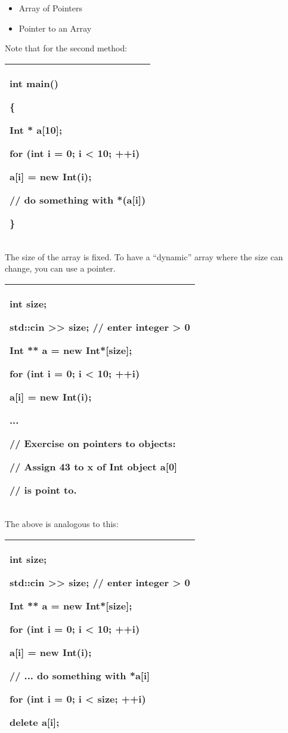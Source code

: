 \documentclass[
]{article}
\providecommand{\tightlist}{%
  \setlength{\itemsep}{0pt}\setlength{\parskip}{0pt}}
\begin{document}
\begin{itemize}
\tightlist
\item
  Array of Pointers
\item
  Pointer to an Array
\end{itemize}

Note that for the second method:

\begin{longtable}[]{@{}l@{}}
\toprule
\endhead
\begin{minipage}[t]{0.97\columnwidth}\raggedright
int main()

\{

Int * a{[}10{]};

for (int i = 0; i \textless{} 10; ++i)

a{[}i{]} = new Int(i);

// do something with *(a{[}i{]})

\}\strut
\end{minipage}\tabularnewline
\bottomrule
\end{longtable}

The size of the array is fixed. To have a ``dynamic'' array where the
size can change, you can use a pointer.

\begin{longtable}[]{@{}l@{}}
\toprule
\endhead
\begin{minipage}[t]{0.97\columnwidth}\raggedright
int size;

std::cin \textgreater\textgreater{} size; // enter integer
\textgreater{} 0

Int ** a = new Int*{[}size{]};

for (int i = 0; i \textless{} 10; ++i)

a{[}i{]} = new Int(i);

...

// Exercise on pointers to objects:

// Assign 43 to x of Int object a{[}0{]}

// is point to. \strut
\end{minipage}\tabularnewline
\bottomrule
\end{longtable}

The above is analogous to this:

\begin{longtable}[]{@{}l@{}}
\toprule
\endhead
\begin{minipage}[t]{0.97\columnwidth}\raggedright
int size;

std::cin \textgreater\textgreater{} size; // enter integer
\textgreater{} 0

Int ** a = new Int*{[}size{]};

for (int i = 0; i \textless{} 10; ++i)

a{[}i{]} = new Int(i);

// ... do something with *a{[}i{]}

for (int i = 0; i \textless{} size; ++i)

delete a{[}i{]};\strut
\end{minipage}\tabularnewline
\bottomrule
\end{longtable}
\end{document}

